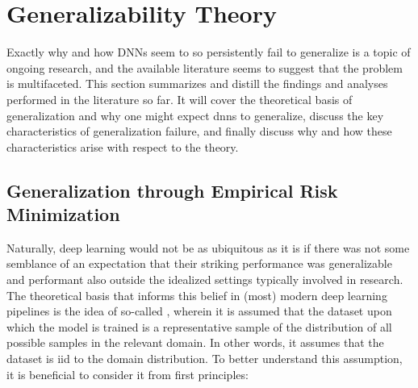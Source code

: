 \section{Generalizability Theory} \label{gen_theory}
	Exactly why and how DNNs seem to so persistently fail to generalize is a topic of ongoing research, and the available literature seems to suggest that the problem is multifaceted. This section summarizes and distill the findings and analyses performed in the literature so far. It will cover the theoretical basis of generalization and why one might expect \glspl{dnn} to generalize, discuss the key characteristics of generalization failure, and finally discuss why and how these characteristics arise with respect to the theory.
	
	\subsection{Generalization through Empirical Risk Minimization} 
		Naturally, deep learning would not be as ubiquitous as it is if there was not some semblance of an expectation that their striking performance was generalizable and performant also outside the idealized settings typically involved in research. The theoretical basis that informs this belief in (most) modern deep learning pipelines is the idea of so-called , wherein it is assumed that the dataset upon which the model is trained is a representative sample of the distribution of all possible samples in the relevant domain. In other words, it assumes that the dataset is \gls{iid} to the domain distribution. To better understand this assumption, it is beneficial to consider it from first principles: 
		
